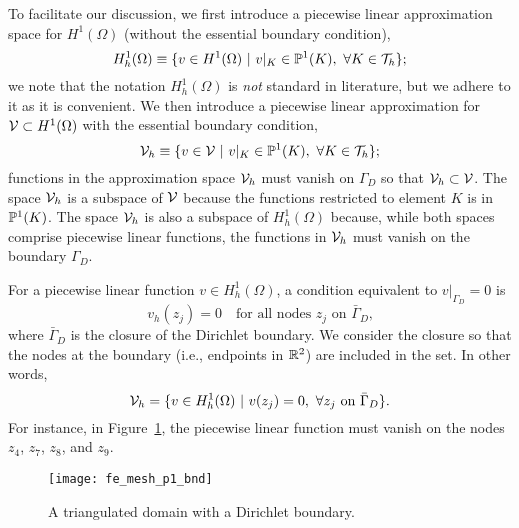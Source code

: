 To facilitate our discussion, we first introduce a piecewise linear approximation space for $H^1(\Omega)$ (without the essential boundary condition),
\begin{equation*}
  H^1_h(\Omega) \equiv \{ v \in H^1(\Omega) \ | \ v|_K \in \PP^1(K), \ \forall K \in \calT_h \};
\end{equation*}
we note that the notation $H^1_h(\Omega)$ is \emph{not} standard in literature, but we adhere to it as it is convenient. We then introduce a piecewise linear approximation for $\mathcal{V} \subset H^1(\Omega)$ with the essential boundary condition,
\begin{equation*}
  \mathcal{V}_h \equiv \{ v \in \mathcal{V} \ | \ v|_K \in \mathbb{P}^1(K), \ \forall K \in \mathcal{T}_h \};
\end{equation*}
functions in the approximation space $\mathcal{V}_h$ must vanish on $\Gamma_D$ so that $\mathcal{V}_h \subset \mathcal{V}$.  The space $\mathcal{V}_h$ is a subspace of $\mathcal{V}$ because the functions restricted to element $K$ is in $\mathbb{P}^1(K)$.  The space $\mathcal{V}_h$ is also a subspace of $H^1_h(\Omega)$ because, while both spaces comprise piecewise linear functions, the functions in $\mathcal{V}_h$ must vanish on the boundary $\Gamma_D$.

For a piecewise linear function $v \in H^1_h(\Omega)$, a condition equivalent to $v|_{\Gamma_D} = 0$ is
\begin{equation*}
  v_h(z_j) = 0 \quad \text{for all nodes $z_j$ on $\bar \Gamma_D$,}
\end{equation*}
where $\bar \Gamma_D$ is the closure of the Dirichlet boundary. 
We consider the closure so that the nodes at the boundary (i.e., endpoints in $\mathbb{R}^2$) are included in the set. In other words,
\begin{equation*}
  \mathcal{V}_h = \{ v \in H^1_h(\Omega) \ | \ v(z_j) = 0, \ \forall z_j \text{ on } \bar \Gamma_D \}.
\end{equation*}
For instance, in Figure~\ref{fig:fe_mesh_p1_bnd}, the piecewise linear function must vanish on the nodes $z_4$, $z_7$, $z_8$, and $z_9$.
\begin{figure}
  \centering
  \texttt{[image: fe\_mesh\_p1\_bnd]}
  \caption{A triangulated domain with a Dirichlet boundary.}
  \label{fig:fe_mesh_p1_bnd}
\end{figure}



